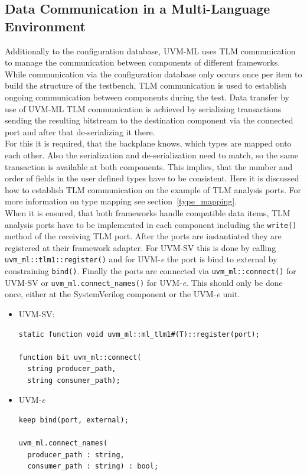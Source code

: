 \subsection{Data Communication in a Multi-Language Environment} \label{ml_tlm}
Additionally to the configuration database, UVM-ML uses TLM communication to manage the communication between components
of different frameworks. While communication via the configuration database only occurs once per item to build the
structure of the testbench, TLM communication is used to establish ongoing communication between components during the
test. Data transfer by use of UVM-ML TLM communication is achieved by serializing transactions sending the resulting
bitstream to the destination component via the connected port and after that de-serializing it there.\\
For this it is required, that the backplane knows, which types are mapped onto each other. Also the serialization and
de-serialization need to match, so the same transaction is available at both components. This implies, that the number
and order of fields in the user defined types have to be consistent.
Here it is discussed how to establish TLM communication on the example of TLM analysis ports. For more information on
type mapping see section~\ref{type_mapping}.\\
When it is ensured, that both frameworks handle compatible data items, TLM analysis ports have to be implemented in each
component including the \lstinline$write()$ method of the receiving TLM port. After the ports are instantiated they
are registered at their framework adapter. For UVM-SV this is done by calling
\lstinline$uvm_ml::tlm1::register()$ and for UVM-\textit{e} the port is bind to external by constraining \lstinline$bind()$.
Finally the ports are connected via \lstinline$uvm_ml::connect()$ for UVM-SV or
\lstinline$uvm_ml.connect_names()$ for UVM-\textit{e}. This should only be done once, either at the
SystemVerilog component or the UVM-\textit{e} unit.
\begin{itemize}
\item{UVM-SV:}
{}
\begin{lstlisting}
static function void uvm_ml::ml_tlm1#(T)::register(port);

function bit uvm_ml::connect(
  string producer_path,
  string consumer_path);
\end{lstlisting} 

\item{UVM-\textit{e}}
{}
\begin{lstlisting}
keep bind(port, external);

uvm_ml.connect_names(
  producer_path : string,
  consumer_path : string) : bool;
\end{lstlisting} 
\end{itemize}

